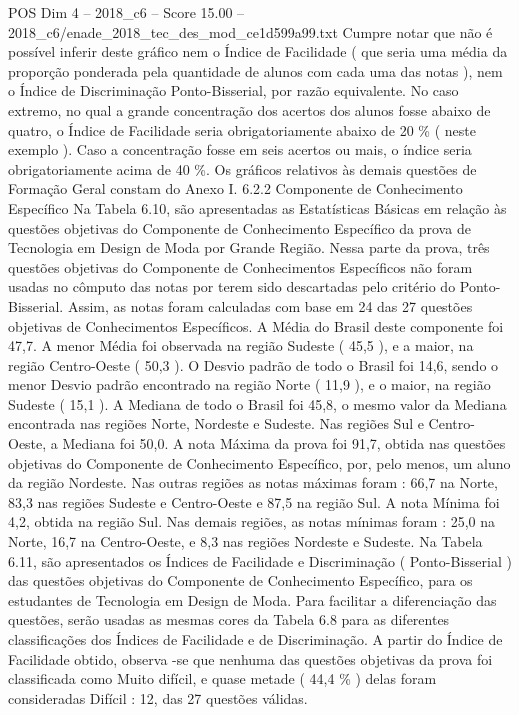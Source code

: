\begin{textsample}{POS Dim 4 – 2018\_c6 – Score 15.00 – 2018\_c6/enade\_2018\_tec\_des\_mod\_ce1d599a99.txt}
Cumpre notar que não é possível inferir deste gráfico nem o Índice de Facilidade ( que seria uma média da proporção ponderada pela quantidade de alunos com cada uma das notas ), nem o Índice de Discriminação Ponto-Bisserial, por razão equivalente.
No caso extremo, no qual a grande concentração dos acertos dos alunos fosse abaixo de quatro, o Índice de Facilidade seria obrigatoriamente abaixo de 20 \% ( neste exemplo ).
Caso a concentração fosse em seis acertos ou mais, o índice seria obrigatoriamente acima de 40 \%.
Os gráficos relativos às demais questões de Formação Geral constam do Anexo I. 6.2.2 Componente de Conhecimento Específico Na Tabela 6.10, são apresentadas as Estatísticas Básicas em relação às questões objetivas do Componente de Conhecimento Específico da prova de Tecnologia em Design de Moda por Grande Região.
Nessa parte da prova, três questões objetivas do Componente de Conhecimentos Específicos não foram usadas no cômputo das notas por terem sido descartadas pelo critério do Ponto-Bisserial.
Assim, as notas foram calculadas com base em 24 das 27 questões objetivas de Conhecimentos Específicos.
A Média do Brasil deste componente foi 47,7.
A menor Média foi observada na região Sudeste ( 45,5 ), e a maior, na região Centro-Oeste ( 50,3 ).
O Desvio padrão de todo o Brasil foi 14,6, sendo o menor Desvio padrão encontrado na região Norte ( 11,9 ), e o maior, na região Sudeste ( 15,1 ).
A Mediana de todo o Brasil foi 45,8, o mesmo valor da Mediana encontrada nas regiões Norte, Nordeste e Sudeste.
Nas regiões Sul e Centro-Oeste, a Mediana foi 50,0.
A nota Máxima da prova foi 91,7, obtida nas questões objetivas do Componente de Conhecimento Específico, por, pelo menos, um aluno da região Nordeste.
Nas outras regiões as notas máximas foram : 66,7 na Norte, 83,3 nas regiões Sudeste e Centro-Oeste e 87,5 na região Sul.
A nota Mínima foi 4,2, obtida na região Sul.
Nas demais regiões, as notas mínimas foram : 25,0 na Norte, 16,7 na Centro-Oeste, e 8,3 nas regiões Nordeste e Sudeste.
Na Tabela 6.11, são apresentados os Índices de Facilidade e Discriminação ( Ponto-Bisserial ) das questões objetivas do Componente de Conhecimento Específico, para os estudantes de Tecnologia em Design de Moda.
Para facilitar a diferenciação das questões, serão usadas as mesmas cores da Tabela 6.8 para as diferentes classificações dos Índices de Facilidade e de Discriminação.
A partir do Índice de Facilidade obtido, observa -se que nenhuma das questões objetivas da prova foi classificada como Muito difícil, e quase metade ( 44,4 \% ) delas foram consideradas Difícil : 12, das 27 questões válidas.

\end{textsample}
